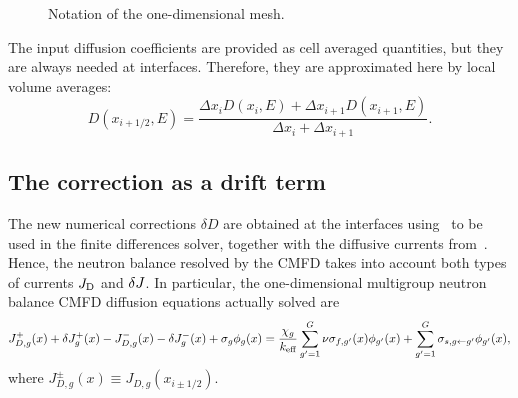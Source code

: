 \begin{figure}[htbp] 
	\centering
	\caption{Notation of the one-dimensional mesh.}
	\label{fig:mesh1D}
\end{figure}
%
The input diffusion coefficients are provided as cell averaged quantities, but they are always needed at interfaces. Therefore, they are approximated here by local volume averages:
\begin{equation}\label{eq:Ds}
D(x_{i+1/2},E) = \frac{\Delta x_i D(x_i,E) 
	+ \Delta x_{i+1} D(x_{i+1},E)}
{ \Delta x_i + \Delta x_{i+1}} .
\end{equation}

%
\subsection{The correction as a drift term}
\label{sec:corr-drift}

The new numerical corrections $\delta D$ are obtained at the interfaces using~ to be used in the finite differences solver, together with the diffusive currents from~. Hence, the neutron balance resolved by the CMFD takes into account both types of currents $J_{\textrm{\scriptsize{D}}}$ and $\delta J$. %
In particular, the one-dimensional multigroup neutron balance CMFD diffusion equations actually solved are
\begin{equation}\label{eq:diff1}
J_{D,g}^+(x) + \delta J_g^+(x) -  J_{D,g}^-(x) - \delta J_g^-(x) + \sigma_{g}\phi_g(x) =  \frac{\chi_g}{{k_{\textrm{\scriptsize{eff}}}}}\sum\limits_{g'=1}^G\nu\sigma_{f,g'}(x)\phi_{g'}(x) + \sum\limits_{g'=1}^G\sigma_{s,g\leftarrow g'}\phi_{g'}(x),
\end{equation}
where $J_{D,g}^\pm (x)\equiv J_{D,g}(x_{i\pm 1/2})$.

